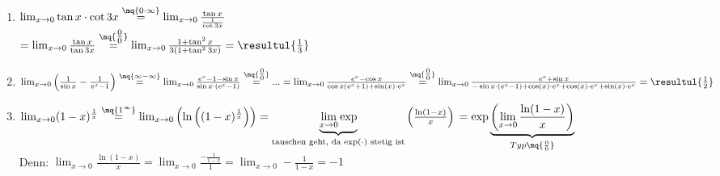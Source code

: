 \begin{enumerate}[label=\alph*.)]
\item $\lim_{x\to 0} \tan x \cdot \cot 3x \overset{\mq{0 \cdot \infty}}{=}\lim_{x\to 0} \frac{\tan x}{\frac{1}{\cot 3x}}$\\
$=\lim_{x\to 0} \frac{\tan x}{\tan 3x}\overset{\mq{\tfrac{0}{0}}}{=}\lim_{x\to 0} \frac{1+\tan^2x}{3(1+\tan^23x)}=\resultul{\frac{1}{3}}$
\item $\lim_{x \to 0} \left( \frac{1}{\sin x}-\frac{1}{e^x-1}\right)\overset{\mq{\infty - \infty}}{=} \lim_{x\to 0} \frac{e^x-1-\sin x}{\sin x \cdot (e^x-1)}\overset{\mq{\tfrac{0}{0}}}{=}... \\
= \lim_{x\to 0} \frac{e^x - \cos x}{\cos x (e^x+1)+\sin (x) \cdot e^x}\\
\overset{\mq{\tfrac{0}{0}}}{=}\lim_{x \to 0}\frac{e^x + \sin x}{-\sin x \cdot  (e^x-1) + \cos (x) \cdot  e^x+\cos (x) \cdot  e^x + \sin(x) \cdot e^x }= \resultul{\frac{1}{2}}$
\item $\lim_{x\to 0 } (1-x)^{\frac{1}{x}} \overset{\mq{1^\infty}}{=}\lim_{x\to 0} \left( \ln\left( (1-x)^{\frac{1}{x}}\right)\right)=\underbrace{\lim_{x\to 0} \exp}_{\text{tauschen geht, da $\exp(\cdot)$ stetig ist}}\left(\frac{\ln(1-x)}{x}\right)\\
= \exp\underbrace{\left(\lim_{x\to 0}\frac{\ln (1-x)}{x}\right)}_{Typ \mq{\frac{0}{0}}}$\\
Denn: $\lim_{x\to 0} \frac{\ln (1-x)}{x}=\lim_{x\to 0} \frac{-\frac{1}{1-x}}{1}=\lim_{x\to 0} - \frac{1}{1-x}=-1$
\end{enumerate}


